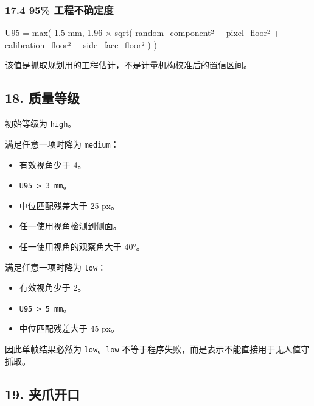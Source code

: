 \documentclass[
  chinese,
  11pt,
  a4paper,
]{article}
\newenvironment{Shaded}{\begin{snugshade}}{\end{snugshade}}
\newcommand{\NormalTok}[1]{#1}
\providecommand{\tightlist}{%
  \setlength{\itemsep}{0pt}\setlength{\parskip}{0pt}}
\begin{document}
\subsubsection{17.4 95\%
工程不确定度}\label{174-95-ux5de5ux7a0bux4e0dux786eux5b9aux5ea6}

\begin{Shaded}
\begin{Highlighting}[]
\NormalTok{U95 = max(}
\NormalTok{  1.5 mm,}
\NormalTok{  1.96 × sqrt(}
\NormalTok{    random\_component²}
\NormalTok{    + pixel\_floor²}
\NormalTok{    + calibration\_floor²}
\NormalTok{    + side\_face\_floor²}
\NormalTok{  )}
\NormalTok{)}
\end{Highlighting}
\end{Shaded}

该值是抓取规划用的工程估计，不是计量机构校准后的置信区间。

\subsection{18. 质量等级}\label{18-ux8d28ux91cfux7b49ux7ea7}

初始等级为 \texttt{high}。

满足任意一项时降为 \texttt{medium}：

\begin{itemize}
\tightlist
\item
  有效视角少于 4。
\item
  \texttt{U95\ \textgreater{}\ 3\ mm}。
\item
  中位匹配残差大于 25 px。
\item
  任一使用视角检测到侧面。
\item
  任一使用视角的观察角大于 40°。
\end{itemize}

满足任意一项时降为 \texttt{low}：

\begin{itemize}
\tightlist
\item
  有效视角少于 2。
\item
  \texttt{U95\ \textgreater{}\ 5\ mm}。
\item
  中位匹配残差大于 45 px。
\end{itemize}

因此单帧结果必然为 \texttt{low}。\texttt{low}
不等于程序失败，而是表示不能直接用于无人值守抓取。

\subsection{19. 夹爪开口}\label{19-ux5939ux722aux5f00ux53e3}
\end{document}
